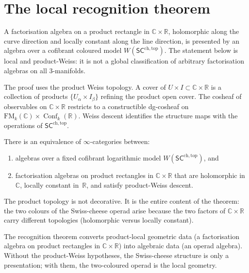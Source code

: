 \documentclass[11pt]{article}
\newcommand{\C}{\mathbb{C}}
\newcommand{\R}{\mathbb{R}}
\newcommand{\SCchtop}{\mathsf{SC}^{\mathrm{ch,top}}}
\newcommand{\FM}{\mathrm{FM}}
\DeclareMathOperator{\Conf}{Conf}
\begin{document}
\section{The local recognition theorem}
\label{sec:recognition}

A factorisation algebra on a product rectangle in $\C \times \R$,
holomorphic along the curve direction and locally constant along
the line direction, is presented by an algebra over a cofibrant
coloured model $W(\SCchtop)$.  The statement below is local and
product-Weiss: it is not a global classification of arbitrary
factorisation algebras on all $3$-manifolds.

The proof uses the product Weiss topology.  A cover of
$U \times I \subset \C \times \R$ is a collection of products
$\{U_\alpha \times I_\beta\}$ refining the product open cover.
The cosheaf of observables on $\C \times \R$ restricts to a
constructible dg-cosheaf on $\FM_k(\C) \times \Conf_k(\R)$.
Weiss descent identifies the structure maps with the operations
of $\SCchtop$.

\begin{theorem}
\label{thm:recognition-wn}
There is an equivalence of $\infty$-categories between:
\begin{enumerate}[label=\textup{(\roman*)},nosep]
\item algebras over a fixed cofibrant logarithmic model
  $W(\SCchtop)$, and
\item factorisation algebras on product rectangles in
  $\C \times \R$ that are holomorphic in $\C$, locally constant
  in~$\R$, and satisfy product-Weiss descent.
\end{enumerate}
\end{theorem}

\noindent
The product topology is not decorative.  It is the entire content
of the theorem: the two colours of the Swiss-cheese operad arise
because the two factors of $\C \times \R$ carry different
topologies (holomorphic versus locally constant).

\medskip

The recognition theorem converts product-local geometric data
(a factorisation algebra on product rectangles in $\C\times\R$)
into algebraic data (an operad algebra).  Without the
product-Weiss hypotheses, the Swiss-cheese structure is only a
presentation; with them, the two-coloured operad is the local
geometry.
\end{document}
